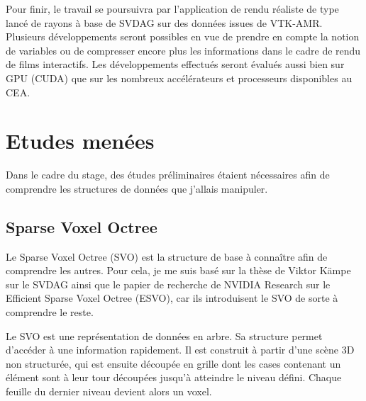 \documentclass[12pt,a4paper,twoside]{article}
\begin{document}
    Pour finir, le travail se poursuivra par l'application de rendu réaliste de type lancé de rayons à base de SVDAG sur
    des données issues de VTK-AMR. Plusieurs développements seront possibles en vue de prendre en compte la notion de variables ou de
    compresser encore plus les informations dans le cadre de rendu de films interactifs. Les développements effectués seront
    évalués aussi bien sur GPU (CUDA) que sur les nombreux accélérateurs et processeurs disponibles au CEA.

    \newpage
    \section{Etudes menées}     %

    Dans le cadre du stage, des études préliminaires étaient nécessaires afin de comprendre les structures de données que
    j'allais manipuler.

    \subsection{Sparse Voxel Octree}

    Le Sparse Voxel Octree (SVO) est la structure de base à connaître afin de comprendre les autres.
    Pour cela, je me suis basé sur la thèse de Viktor Kämpe sur le SVDAG ainsi que le papier de recherche de NVIDIA
    Research sur le Efficient Sparse Voxel Octree (ESVO), car ils introduisent le SVO de sorte à comprendre le reste.

    Le SVO est une représentation de données en arbre. Sa structure permet d'accéder à une information rapidement.
    Il est construit à partir d'une scène 3D non structurée, qui est ensuite découpée en grille dont les cases contenant un élément sont à leur tour découpées jusqu'à atteindre le niveau défini.
    Chaque feuille du dernier niveau devient alors un voxel.

    \begin{figure}[H]
    \end{figure}


    \begin{figure}[H]
    \end{figure}
\end{document}
